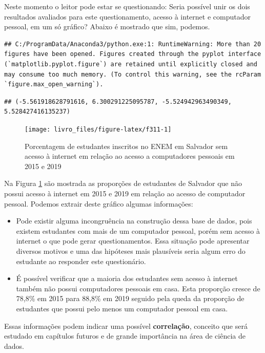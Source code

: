 \documentclass[
  oneside]{book}
\providecommand{\tightlist}{%
  \setlength{\itemsep}{0pt}\setlength{\parskip}{0pt}}
\begin{document}
Neste momento o leitor pode estar se questionando: Seria possível unir os dois resultados avaliados para este questionamento, acesso à internet e computador pessoal, em um só gráfico? Abaixo é mostrado que sim, podemos.

\begin{verbatim}
## C:/ProgramData/Anaconda3/python.exe:1: RuntimeWarning: More than 20 figures have been opened. Figures created through the pyplot interface (`matplotlib.pyplot.figure`) are retained until explicitly closed and may consume too much memory. (To control this warning, see the rcParam `figure.max_open_warning`).
\end{verbatim}

\begin{verbatim}
## (-5.561918628791616, 6.300291225095787, -5.524942963490349, 5.528427416135237)
\end{verbatim}

\begin{figure}

{\centering \texttt{[image: livro\_files/figure-latex/f311-1]} 

}

\caption{Porcentagem de estudantes inscritos no ENEM em Salvador sem acesso à internet em relação ao acesso a computadores pessoais em 2015 e 2019}\label{fig:f311}
\end{figure}

Na Figura \ref{fig:f311} são mostrada as proporções de estudantes de Salvador que não possui acesso à internet em 2015 e 2019 em relação ao acesso de computador pessoal. Podemos extrair deste gráfico algumas informações:

\begin{itemize}
\tightlist
\item
  Pode existir alguma incongruência na construção dessa base de dados, pois existem estudantes com mais de um computador pessoal, porém sem acesso à internet o que pode gerar questionamentos. Essa situação pode apresentar diversos motivos e uma das hipóteses mais plausíveis seria algum erro do estudante ao responder este questionário.
\item
  É possível verificar que a maioria dos estudantes sem acesso à internet também não possui computadores pessoais em casa. Esta proporção cresce de 78,8\% em 2015 para 88,8\% em 2019 seguido pela queda da proporção de estudantes que possui pelo menos um computador pessoal em casa.
\end{itemize}

Essas informações podem indicar uma possível \textbf{correlação}, conceito que será estudado em capítulos futuros e de grande importância na área de ciência de dados.
\end{document}
